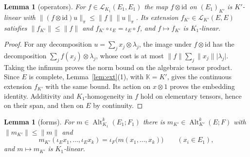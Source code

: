 \documentclass[11pt]{amsart}
\newtheorem{lemma}[theorem]{Lemma}
\theoremstyle{definition}
\theoremstyle{remark}
\numberwithin{equation}{section}
\newcommand{\cL}{\mathcal L}
\newcommand{\Alt}{\operatorname{Alt}}
\newcommand{\id}{\mathrm{id}}
\newcommand{\abs}[1]{\lvert #1\rvert}
\newcommand{\norm}[1]{\lVert #1\rVert}
\begin{document}
\begin{lemma}[operators]\label{lem:ops}
For $f\in\cL_{K_1}(E_1,E_1)$ the map $f\otimes\id$ on $(E_1)_{K'}$ is $K'$\nobreakdash-linear with
$\norm{(f\otimes\id)u}_\pi\le\norm f\norm u_\pi$. Its extension $f_{K'}\in\cL_{K'}(E,E)$ satisfies $\norm{f_{K'}}\le\norm f$
and $f_{K'}\circ\iota_E=\iota_E\circ f$, and $f\mapsto f_{K'}$ is $K_1$\nobreakdash-linear.
\end{lemma}

\begin{proof}
For any decomposition $u=\sum_jx_j\otimes\lambda_j$, the image under $f\otimes\id$ has the decomposition
$\sum_jf(x_j)\otimes\lambda_j$, whose cost is at most
$\norm f\sum_j\norm{x_j}\abs{\lambda_j}$. Taking the infimum proves the norm bound on the algebraic tensor product.
Since $E$ is complete, Lemma~\ref{lem:ext}(1), with $\mathbb K=K'$, gives the continuous extension $f_{K'}$ with the
same bound. Its action on $x\otimes1$ proves the embedding identity. Additivity and $K_1$\nobreakdash-homogeneity in
$f$ hold on elementary tensors, hence on their span, and then on $E$ by continuity.
\end{proof}

\begin{lemma}[forms]\label{lem:forms-bc}
For $m\in\Alt^k_{K_1}(E_1;F_1)$ there is $m_{K'}\in\Alt^k_{K'}(E;F)$ with $\norm{m_{K'}}\le\norm m$ and
\[
m_{K'}(\iota_Ex_1,\dots,\iota_Ex_k)=\iota_F\bigl(m(x_1,\dots,x_k)\bigr)\qquad(x_i\in E_1),
\]
and $m\mapsto m_{K'}$ is $K_1$\nobreakdash-linear.
\end{lemma}
\end{document}

